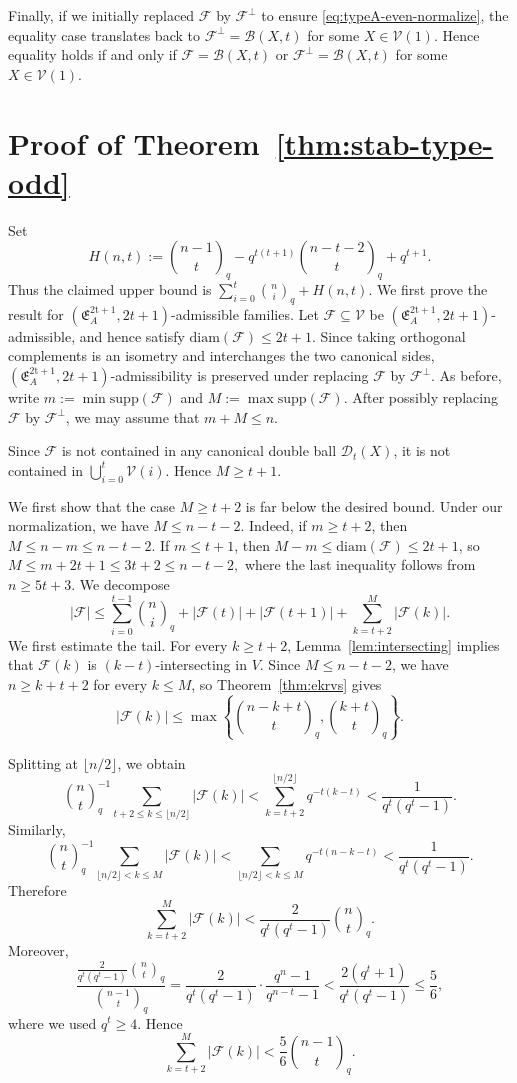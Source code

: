 \documentclass[11pt]{article}
\theoremstyle{definition}
\newcommand{\qbinom}[2]{\genfrac{(}{)}{0pt}{}{#1}{#2}_q}
\newcommand{\diam}{\mathrm{diam}}
\newcommand{\supp}{\mathrm{supp}}
\begin{document}
Finally, if we initially replaced $\mathcal F$ by $\mathcal F^\perp$ to ensure \eqref{eq:typeA-even-normalize}, the equality case translates back to $\mathcal F^\perp=\mathcal B(X,t)$ for some $X\in\mathcal V(1)$. 
Hence equality holds if and only if $\mathcal F=\mathcal B(X,t)$ or $\mathcal F^\perp=\mathcal B(X,t)$ for some $X\in\mathcal V(1)$.


\section{Proof of Theorem~\ref{thm:stab-type-odd}}\label{sec:stab-odd}
Set
\[
H(n,t):=\qbinom{n-1}{t}
-
q^{t(t+1)}\qbinom{n-t-2}{t}
+
q^{t+1}.
\]
Thus the claimed upper bound is
\(
\sum_{i=0}^{t}\qbinom{n}{i}+H(n,t).
\)
We first prove the result for $(\mathfrak E_A^{\mathrm{2t+1}},2t+1)$-admissible families. 
Let $\mathcal F\subseteq\mathcal V$ be $(\mathfrak E_A^{\mathrm{2t+1}},2t+1)$-admissible, and hence satisfy $\diam(\mathcal F)\le 2t+1$. 
Since taking orthogonal complements is an isometry and interchanges the two canonical sides, $(\mathfrak E_A^{\mathrm{2t+1}},2t+1)$-admissibility is preserved under replacing $\mathcal F$ by $\mathcal F^\perp$. 
As before, write $m:=\min\supp(\mathcal F)$ and $M:=\max\supp(\mathcal F)$. 
After possibly replacing $\mathcal F$ by $\mathcal F^\perp$, we may assume that $m+M\le n$.

Since $\mathcal F$ is not contained in any canonical double ball $\mathcal D_t(X)$, it is not contained in $\bigcup_{i=0}^{t}\mathcal V(i)$. 
Hence $M\ge t+1$.

We first show that the case $M\ge t+2$ is far below the desired bound. 
Under our normalization, we have $M\le n-t-2$. 
Indeed, if $m\ge t+2$, then $M\le n-m\le n-t-2$. 
If $m\le t+1$, then $M-m\le \diam(\mathcal F)\le 2t+1$, so
\(
M\le m+2t+1\le 3t+2\le n-t-2,
\)
where the last inequality follows from $n\ge 5t+3$. We decompose
\[
|\mathcal F|
\le
\sum_{i=0}^{t-1}\qbinom{n}{i}
+
|\mathcal F(t)|+|\mathcal F(t+1)|
+
\sum_{k=t+2}^{M}|\mathcal F(k)|.
\]
We first estimate the tail. 
For every $k\ge t+2$, Lemma~\ref{lem:intersecting} implies that $\mathcal F(k)$ is $(k-t)$-intersecting in $V$. 
Since $M\le n-t-2$, we have $n\ge k+t+2$ for every $k\le M$, so Theorem~\ref{thm:ekrvs} gives
\[
|\mathcal F(k)|
\le
\max\left\{
\qbinom{n-k+t}{t},
\qbinom{k+t}{t}
\right\}.
\]

Splitting at $\lfloor n/2\rfloor$, we obtain
\[
\qbinom{n}{t}^{-1}
\sum_{t+2\le k\le \lfloor n/2\rfloor}|\mathcal F(k)|
<
\sum_{k=t+2}^{\lfloor n/2\rfloor}q^{-t(k-t)}
<
\frac{1}{q^t(q^t-1)}.
\]
Similarly,
\[
\qbinom{n}{t}^{-1}
\sum_{\lfloor n/2\rfloor<k\le M}|\mathcal F(k)|
<
\sum_{\lfloor n/2\rfloor<k\le M}q^{-t(n-k-t)}
<
\frac{1}{q^t(q^t-1)}.
\]
Therefore
\[
\sum_{k=t+2}^{M}|\mathcal F(k)|
<
\frac{2}{q^t(q^t-1)}\qbinom{n}{t}.
\]
Moreover,
\[
\frac{\frac{2}{q^t(q^t-1)}\qbinom{n}{t}}{\qbinom{n-1}{t}}
=
\frac{2}{q^t(q^t-1)}
\cdot
\frac{q^n-1}{q^{n-t}-1}
<
\frac{2(q^t+1)}{q^t(q^t-1)}
\le \frac56,
\]
where we used $q^t\ge 4$. Hence
\begin{equation}\label{eq:odd-stab-tail}
\sum_{k=t+2}^{M}|\mathcal F(k)|
<
\frac56\qbinom{n-1}{t}.
\end{equation}
\end{document}
